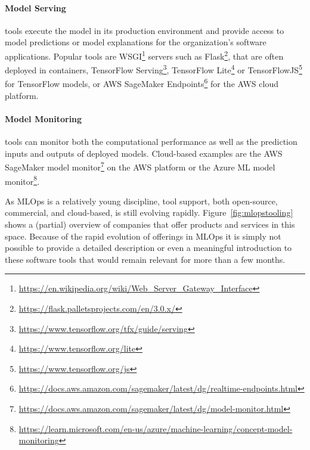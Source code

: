 \paragraph*{Model Serving} tools execute the model in its production environment and provide access to model predictions or model explanations for the organization's software applications. Popular tools are WSGI\footnote{\url{https://en.wikipedia.org/wiki/Web_Server_Gateway_Interface}} servers such as Flask\footnote{\url{https://flask.palletsprojects.com/en/3.0.x/}}, that are often deployed in containers, TensorFlow Serving\footnote{\url{https://www.tensorflow.org/tfx/guide/serving}}, TensorFlow Lite\footnote{\url{https://www.tensorflow.org/lite}} or TensorFlowJS\footnote{\url{https://www.tensorflow.org/js}} for TensorFlow models, or AWS SageMaker Endpoints\footnote{\url{https://docs.aws.amazon.com/sagemaker/latest/dg/realtime-endpoints.html}} for the AWS cloud platform. 

\paragraph*{Model Monitoring} tools can monitor both the computational performance as well as the prediction inputs and outputs of deployed models. Cloud-based examples are the AWS SageMaker model monitor\footnote{\url{https://docs.aws.amazon.com/sagemaker/latest/dg/model-monitor.html}} on the AWS platform or the Azure ML model monitor\footnote{\url{https://learn.microsoft.com/en-us/azure/machine-learning/concept-model-monitoring}}. 

As MLOps is a relatively young discipline, tool support, both open-source, commercial, and cloud-based, is still evolving rapidly. Figure~\ref{fig:mlopstooling} shows a (partial) overview of companies that offer products and services in this space. Because of the rapid evolution of offerings in MLOps it is simply not possible to provide a detailed description or even a meaningful introduction to these software tools that would remain relevant for more than a few months. 

